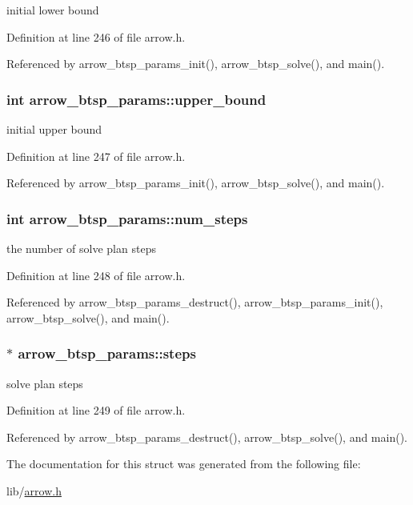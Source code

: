 initial lower bound 

Definition at line 246 of file arrow.h.

Referenced by arrow\_\-btsp\_\-params\_\-init(), arrow\_\-btsp\_\-solve(), and main().\hypertarget{structarrow__btsp__params_b8749004215015a78139b8e4e1fb8905}{
\subsubsection{\setlength{\rightskip}{0pt plus 5cm}int {\bf arrow\_\-btsp\_\-params::upper\_\-bound}}}
\label{structarrow__btsp__params_b8749004215015a78139b8e4e1fb8905}


initial upper bound 

Definition at line 247 of file arrow.h.

Referenced by arrow\_\-btsp\_\-params\_\-init(), arrow\_\-btsp\_\-solve(), and main().\hypertarget{structarrow__btsp__params_2897d24f2fdd53c723609cf68880f55e}{
\subsubsection{\setlength{\rightskip}{0pt plus 5cm}int {\bf arrow\_\-btsp\_\-params::num\_\-steps}}}
\label{structarrow__btsp__params_2897d24f2fdd53c723609cf68880f55e}


the number of solve plan steps 

Definition at line 248 of file arrow.h.

Referenced by arrow\_\-btsp\_\-params\_\-destruct(), arrow\_\-btsp\_\-params\_\-init(), arrow\_\-btsp\_\-solve(), and main().\hypertarget{structarrow__btsp__params_49aedb95b2fc4a725e3bb8485470484b}{
\subsubsection{$\ast$ {\bf arrow\_\-btsp\_\-params::steps}}}
\label{structarrow__btsp__params_49aedb95b2fc4a725e3bb8485470484b}


solve plan steps 

Definition at line 249 of file arrow.h.

Referenced by arrow\_\-btsp\_\-params\_\-destruct(), arrow\_\-btsp\_\-solve(), and main().

The documentation for this struct was generated from the following file:\begin{CompactItemize}
\item 
lib/\hyperlink{arrow_8h}{arrow.h}\end{CompactItemize}
